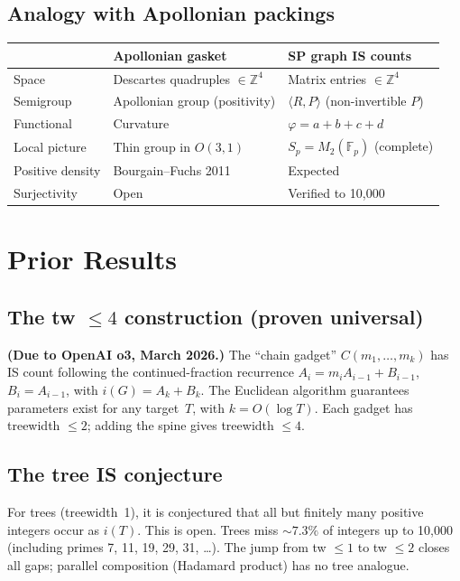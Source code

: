 \documentclass[11pt,a4paper]{article}
\theoremstyle{definition}
\theoremstyle{remark}
\newcommand{\FF}{\mathbb{F}}
\newcommand{\ZZ}{\mathbb{Z}}
\begin{document}
\subsection{Analogy with Apollonian packings}

\begin{center}
\begin{tabular}{lll}
\toprule
 & Apollonian gasket & SP graph IS counts \\
\midrule
Space & Descartes quadruples $\in \ZZ^4$ & Matrix entries $\in \ZZ^4$ \\
Semigroup & Apollonian group (positivity) & $\langle R, P \rangle$ (non-invertible $P$) \\
Functional & Curvature & $\varphi = a+b+c+d$ \\
Local picture & Thin group in $O(3,1)$ & $S_p = M_2(\FF_p)$ (complete) \\
Positive density & Bourgain--Fuchs 2011 & Expected \\
Surjectivity & Open & Verified to 10{,}000 \\
\bottomrule
\end{tabular}
\end{center}

\section{Prior Results}

\subsection{The tw $\leq 4$ construction (proven universal)}

\textbf{(Due to OpenAI o3, March 2026.)} The ``chain gadget'' $C(m_1, \ldots, m_k)$ has IS count following the continued-fraction recurrence $A_i = m_i A_{i-1} + B_{i-1}$, $B_i = A_{i-1}$, with $i(G) = A_k + B_k$. The Euclidean algorithm guarantees parameters exist for any target~$T$, with $k = O(\log T)$. Each gadget has treewidth $\leq 2$; adding the spine gives treewidth $\leq 4$.

\subsection{The tree IS conjecture}

For trees (treewidth~1), it is conjectured that all but finitely many positive integers occur as $i(T)$. This is open. Trees miss ${\sim}7.3\%$ of integers up to 10{,}000 (including primes 7, 11, 19, 29, 31, \ldots). The jump from tw $\leq 1$ to tw $\leq 2$ closes all gaps; parallel composition (Hadamard product) has no tree analogue.
\end{document}
